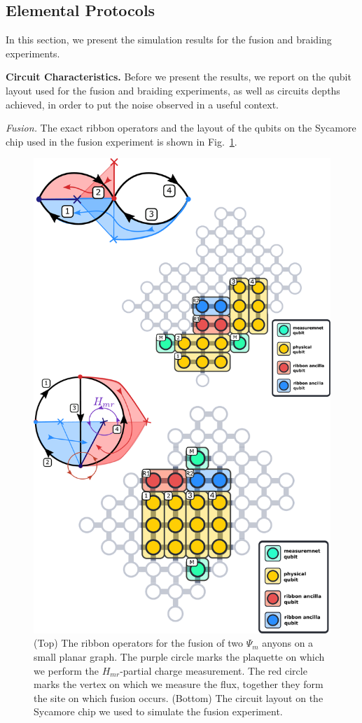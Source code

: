 \documentclass[two column]{article}
\begin{document}
\subsection{Elemental Protocols}\label{sec:num:elem}

In this section, we present the simulation results for the fusion and braiding experiments.

\textbf{Circuit Characteristics.} Before we present the results, we report on the qubit layout used for the fusion and braiding experiments, as well as circuits depths achieved, in order to put the noise observed in a useful context.

\emph{Fusion.} 
The exact ribbon operators and the layout of the qubits on the Sycamore chip used in the fusion experiment is shown in Fig.~\ref{fig:fusion_setup}.
\begin{figure}
	\centering
	\includegraphics[width=\linewidth]{Figures/basket_fusion.pdf}
	\caption{(Top) The ribbon operators for the fusion of two $\Psi_m$ anyons on a small planar graph. The purple circle marks the plaquette on which we perform the $H_{mr}$-partial charge measurement. The red circle marks the vertex on which we measure the flux, together they form the site on which fusion occurs. (Bottom) The circuit layout on the Sycamore chip we used to simulate the fusion experiment.}
	\label{fig:fusion_setup}
\end{figure}
\end{document}

